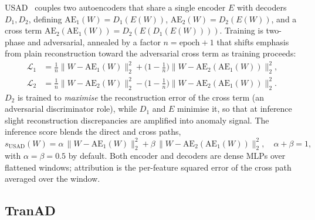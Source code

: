 USAD~\cite{audibert2020usad} couples two autoencoders that share a single encoder $E$ with decoders $D_1, D_2$, defining $\mathrm{AE}_1(W) = D_1(E(W))$, $\mathrm{AE}_2(W) = D_2(E(W))$, and a cross term $\mathrm{AE}_2(\mathrm{AE}_1(W)) = D_2(E(D_1(E(W))))$.  Training is two-phase and adversarial, annealed by a factor $n = \text{epoch} + 1$ that shifts emphasis from plain reconstruction toward the adversarial cross term as training proceeds:
\begin{align}
  \mathcal{L}_1 &= \tfrac{1}{n}\lVert W - \mathrm{AE}_1(W)\rVert_2^{2} + \bigl(1 - \tfrac{1}{n}\bigr)\lVert W - \mathrm{AE}_2(\mathrm{AE}_1(W))\rVert_2^{2}, \\
  \mathcal{L}_2 &= \tfrac{1}{n}\lVert W - \mathrm{AE}_2(W)\rVert_2^{2} - \bigl(1 - \tfrac{1}{n}\bigr)\lVert W - \mathrm{AE}_2(\mathrm{AE}_1(W))\rVert_2^{2}.
\end{align}
$D_2$ is trained to \emph{maximise} the reconstruction error of the cross term (an adversarial discriminator role), while $D_1$ and $E$ minimise it, so that at inference slight reconstruction discrepancies are amplified into anomaly signal.  The inference score blends the direct and cross paths,
\begin{equation}
  s_{\mathrm{USAD}}(W) = \alpha\,\lVert W - \mathrm{AE}_1(W)\rVert_2^{2} + \beta\,\lVert W - \mathrm{AE}_2(\mathrm{AE}_1(W))\rVert_2^{2},
  \quad \alpha + \beta = 1,
\end{equation}
with $\alpha = \beta = 0.5$ by default.  Both encoder and decoders are dense MLPs over flattened windows; attribution is the per-feature squared error of the cross path averaged over the window.

\subsection{TranAD}
\label{sec:det-tranad}

